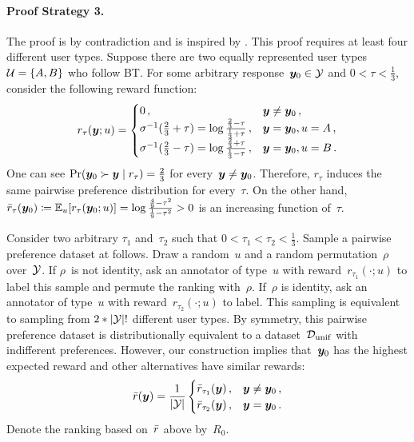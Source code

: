 \begin{proofEnd}
    \paragraph{Proof Strategy 3.}
    The proof is by contradiction and is inspired by \citet{procaccia2025clone}. This proof requires at least four different user types. Suppose there are two equally represented user types~${\mathcal{U}} = \{A, B\}$ who follow BT. For some arbitrary response~${\bm{y}}_0 \in {\mathcal{Y}}$ and $0 < \tau < \frac{1}{3}$, consider the following reward function:
    \begin{equation}
        r_\tau({\bm{y}}; u) = \begin{cases}
            0 \,, & {\bm{y}} \neq {\bm{y}}_0 \,, \\
            \sigma^{-1}(\frac{2}{3} + \tau) = \log \frac{\frac{2}{3} - \tau}{\frac{1}{3} + \tau} \,, & {\bm{y}} = {\bm{y}}_0, u = A \,, \\
            \sigma^{-1}(\frac{2}{3} - \tau) = \log \frac{\frac{2}{3} + \tau}{\frac{1}{3} - \tau} \,, & {\bm{y}} = {\bm{y}}_0, u = B \,.
        \end{cases}
    \end{equation}
    One can see $\Pr({\bm{y}}_0 \succ {\bm{y}} \mid r_\tau) = \frac{2}{3}$ for every~${\bm{y}} \neq {\bm{y}}_0$. Therefore, $r_\tau$ induces the same pairwise preference distribution for every~$\tau$. On the other hand, ${\bar{r}}_\tau({\bm{y}}_0) \coloneqq \mathbb{E}_u[r_\tau({\bm{y}}_0; u)] = \log \frac{\frac{4}{9} - \tau^2}{\frac{1}{9} - \tau^2} > 0$ is an increasing function of~$\tau$. 

    Consider two arbitrary $\tau_1$ and~$\tau_2$ such that $0 < \tau_1 < \tau_2 < \frac{1}{3}$. Sample a pairwise preference dataset at follows. Draw a random~$u$ and a random permutation~$\rho$ over~${\mathcal{Y}}$. If $\rho$~is not identity, ask an annotator of type~$u$ with reward~$r_{\tau_1}(\cdot; u)$ to label this sample and permute the ranking with~$\rho$. If~$\rho$ is identity, ask an annotator of type~$u$ with reward~$r_{\tau_2}(\cdot; u)$ to label. This sampling is equivalent to sampling from $2*|{\mathcal{Y}}|!$ different user types. By symmetry, this pairwise preference dataset is distributionally equivalent to a dataset~${\mathcal{D}}_{\rm unif}$ with indifferent preferences. However, our construction implies that~${\bm{y}}_0$ has the highest expected reward and other alternatives have similar rewards:
    \begin{equation*}
        {\bar{r}}({\bm{y}}) = \frac{1}{|{\mathcal{Y}}|} \begin{cases}
            {\bar{r}}_{\tau_1}({\bm{y}}) \,, & {\bm{y}} \neq {\bm{y}}_0 \,, \\
            {\bar{r}}_{\tau_2}({\bm{y}}) \,, & {\bm{y}} = {\bm{y}}_0 \,.
        \end{cases}
    \end{equation*}
    Denote the ranking based on~${\bar{r}}$ above by~$R_0$. 


\end{proofEnd}
